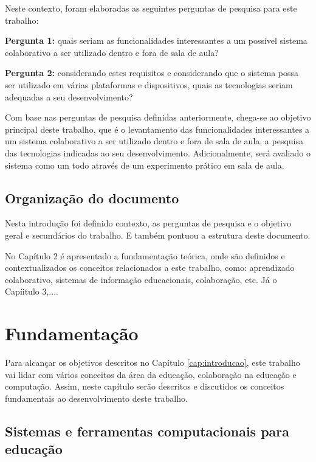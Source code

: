 Neste contexto, foram elaboradas as seguintes perguntas de pesquisa para este trabalho:

\textbf{Pergunta 1:} quais seriam as funcionalidades interessantes a um possível sistema colaborativo a ser utilizado dentro e fora de sala de aula?

\textbf{Pergunta 2:} considerando estes requisitos e considerando que o sistema possa ser utilizado em várias plataformas e dispositivos, quais as tecnologias seriam adequadas a seu desenvolvimento?

Com base nas perguntas de pesquisa definidas anteriormente, chega-se ao objetivo principal deste trabalho, que é o levantamento das funcionalidades interessantes a um sistema colaborativo a ser utilizado dentro e fora de sala de aula, a pesquisa das tecnologias indicadas ao seu desenvolvimento. Adicionalmente, será avaliado o sistema como um todo através de um experimento prático em sala de aula.

\section{Organização do documento}

Nesta introdução foi definido contexto, as perguntas de pesquisa e o objetivo geral e secundários do trabalho. E também pontuou a estrutura deste documento.

No Capítulo 2 é apresentado a fundamentação teórica, onde são definidos e contextualizados os conceitos relacionados a este trabalho, como: aprendizado colaborativo, sistemas de informação educacionais, colaboração, etc. Já o Capíitulo 3,....


\chapter{Fundamentação}
\label{cap:fundamentacao}

Para alcançar os objetivos descritos no Capítulo \ref{cap:introducao}, este trabalho vai lidar com vários conceitos da área da educação, colaboração na educação e computação. Assim, neste capítulo serão descritos e discutidos os conceitos fundamentais ao desenvolvimento deste trabalho.

\section{Sistemas e ferramentas computacionais para educação}



